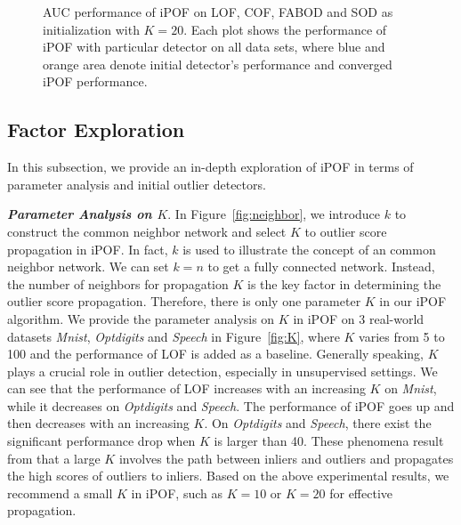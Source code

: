 \documentclass[sigconf,nonacm]{acmart}
\begin{document}
\begin{figure}[t]
  \centering
    \hspace{-2mm}
    \hspace{-6mm}
    \hspace{-2mm}
  \caption{AUC performance of iPOF on LOF, COF, FABOD and SOD as initialization with $K=20$. Each plot shows the performance of iPOF with particular detector on all data sets, where blue and orange area denote initial detector's performance and converged iPOF performance.} \label{fig:radar_plot}
\end{figure}

\vspace{-2mm}

\subsection{Factor Exploration}
In this subsection, we provide an in-depth exploration of iPOF in terms of parameter analysis and initial outlier detectors.

\noindent\textit{\textbf{Parameter Analysis on $K$}}. In Figure\textcolor{red}{~\ref{fig:neighbor}}, we introduce $k$ to construct the common neighbor network and select $K$ to outlier score propagation in iPOF. In fact, $k$ is used to illustrate the concept of an common neighbor network. We can set $k=n$ to get a fully connected network. Instead, the number of neighbors for propagation $K$ is the key factor in determining the outlier score propagation. Therefore, there is only one parameter $K$ in our iPOF algorithm. We provide the parameter analysis on $K$ in iPOF on 3 real-world datasets \textit{Mnist}, \textit{Optdigits} and \textit{Speech} in Figure\textcolor{red}{~\ref{fig:K}}, where $K$ varies from 5 to 100 and the performance of LOF is added as a baseline. Generally speaking, $K$ plays a crucial role in outlier detection, especially in unsupervised settings. We can see that the performance of LOF increases with an increasing $K$ on \textit{Mnist}, while it decreases on \textit{Optdigits} and \textit{Speech}. The performance of iPOF goes up and then decreases with an increasing $K$. On \textit{Optdigits} and \textit{Speech}, there exist the significant performance drop when $K$ is larger than 40. These phenomena result from that a large $K$ involves the path between inliers and outliers and propagates the high scores of outliers to inliers. Based on the above experimental results, we recommend a small $K$ in iPOF, such as $K=10$ or $K=20$ for effective propagation. 
     
\end{document}
